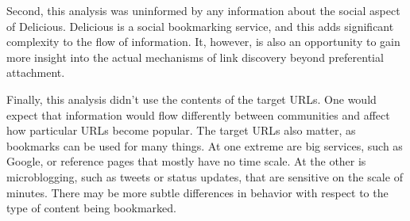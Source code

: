 \documentclass[11pt]{amsart}
\begin{document}
Second, this analysis was uninformed by any information about the social aspect of Delicious. Delicious is a social bookmarking service, and this adds significant complexity to the flow of information. It, however, is also an opportunity to gain more insight into the actual mechanisms of link discovery beyond preferential attachment.

Finally, this analysis didn't use the contents of the target URLs. One would expect that information would flow differently between communities and affect how particular URLs become popular. The target URLs also matter, as bookmarks can be used for many things. At one extreme are big services, such as Google, or reference pages that mostly have no time scale. At the other is microblogging, such as tweets or status updates, that are sensitive on the scale of minutes. There may be more subtle differences in behavior with respect to the type of content being bookmarked.



\end{document}
